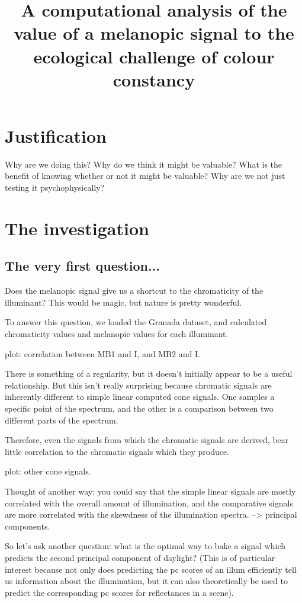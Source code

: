 \documentclass{article}
\title{A computational analysis of the value of a melanopic signal to the ecological challenge of colour constancy}
\date{}
\begin{document}
\maketitle

\section{Justification}

Why are we doing this?
Why do we think it might be valuable?
What is the benefit of knowing whether or not it might be valuable?
Why are we not just testing it psychophysically?

\section{The investigation}
\subsection{The very first question...}
Does the melanopic signal give us a shortcut to the chromaticity of the illuminant? This would be magic, but nature is pretty wonderful.

To answer this question, we loaded the Granada dataset, and calculated chromaticity values and melanopic values for each illuminant. 

plot: correlation between MB1 and I, and MB2 and I.

There is something of a regularity, but it doesn't initially appear to be a useful relationship. But this isn't really surprising because chromatic signals are inherently different to simple linear computed cone signals. One samples a specific point of the spectrum, and the other is a comparison between two different parts of the spectrum.

Therefore, even the signals from which the chromatic signals are derived, bear little correlation to the chromatic signals which they produce.

plot: other cone signals.

Thought of another way: you could say that the simple linear signals are mostly correlated with the overall amount of illumination, and the comparative signals are more correlated with the skewdness of the illumination spectra. --> principal components.

So let's ask another question: what is the optimal way to bake a signal which predicts the second principal component of daylight? (This is of particular interest because not only does predicting the pc scores of an illum efficiently tell us information about the illumination, but it can also theoretically be used to predict the corresponding pc scores for reflectances in a scene).
\end{document}
